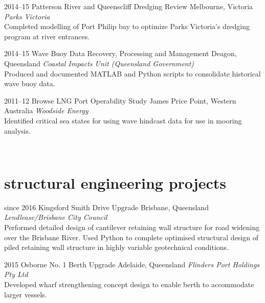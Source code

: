 \documentclass[print]{friggeri}
\begin{document}
\begin{entrylist}
\entry%
{2014--15}
{Patterson River and Queenscliff Dredging Review}
{Melbourne, Victoria}
{\emph{Parks Victoria} \\
Completed modelling of Port Philip bay to optimize Parks Victoria's dredging program at river entrances.}
\end{entrylist}

\begin{entrylist}
\entry%
{2014--15}
{Wave Buoy Data Recovery, Processing and Management}
{Deagon, Queensland}
{\emph{Coastal Impacts Unit (Queensland Government)} \\
Produced and documented MATLAB and Python scripts to consolidate historical wave buoy data.}
\end{entrylist}



\begin{entrylist}
\entry%
{2011--12}
{Browse LNG Port Operability Study}
{James Price Point, Western Australia}
{\emph{Woodside Energy} \\
Identified critical sea states for using wave hindcast data for use in mooring analysis.}
\end{entrylist}
\\


\section{ structural engineering projects}

\begin{entrylist}
\entry%
{since 2016}
{Kingsford Smith Drive Upgrade}
{Brisbane, Queensland}
{\emph{Lendlease/Brisbane City Council} \\
Performed detailed design of cantilever retaining wall structure for road widening over the Brisbane River. Used Python to complete optimised structural design of piled retaining wall structure in highly variable geotechnical conditions.
}
\end{entrylist}

\begin{entrylist}
\entry%
{2015}
{Osborne No. 1 Berth Upgrade}
{Adelaide, Queensland}
{\emph{Flinders Port Holdings Pty Ltd} \\
Developed wharf strengthening concept design to enable berth to accommodate larger vessels.}
\end{entrylist}
\end{document}

